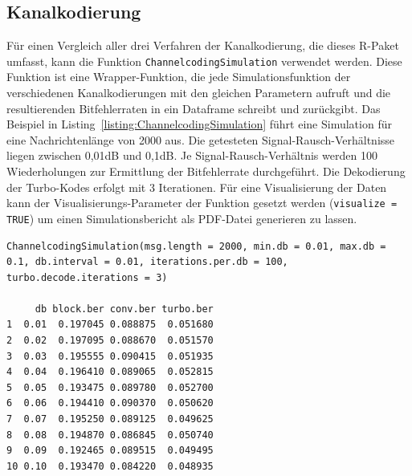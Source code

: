 \subsection{Kanalkodierung}
\label{kapitel:beispiele_simulation_kanalkodierung}
Für einen Vergleich aller drei Verfahren der Kanalkodierung, die dieses R-Paket umfasst, kann die Funktion \texttt{ChannelcodingSimulation} verwendet werden. Diese Funktion ist eine Wrapper-Funktion, die jede Simulationsfunktion der verschiedenen Kanalkodierungen mit den gleichen Parametern aufruft und die resultierenden Bitfehlerraten in ein Dataframe schreibt und zurückgibt. Das Beispiel in Listing~\ref{listing:ChannelcodingSimulation} führt eine Simulation für eine Nachrichtenlänge von 2000 aus. Die getesteten Signal-Rausch-Verhältnisse liegen zwischen 0,01dB und 0,1dB. Je Signal-Rausch-Verhältnis werden 100 Wiederholungen zur Ermittlung der Bitfehlerrate durchgeführt. Die Dekodierung der Turbo-Kodes erfolgt mit 3 Iterationen. Für eine Visualisierung der Daten kann der Visualisierungs-Parameter der Funktion gesetzt werden (\texttt{visualize = TRUE}) um einen Simulationsbericht als PDF-Datei generieren zu lassen.
\begin{lstlisting}[caption=Kanalkodierungs-Simulation, label={listing:ChannelcodingSimulation}, float=!th]
ChannelcodingSimulation(msg.length = 2000, min.db = 0.01, max.db = 0.1, db.interval = 0.01, iterations.per.db = 100, turbo.decode.iterations = 3)

     db block.ber conv.ber turbo.ber
1  0.01  0.197045 0.088875  0.051680
2  0.02  0.197095 0.088670  0.051570
3  0.03  0.195555 0.090415  0.051935
4  0.04  0.196410 0.089065  0.052815
5  0.05  0.193475 0.089780  0.052700
6  0.06  0.194410 0.090370  0.050620
7  0.07  0.195250 0.089125  0.049625
8  0.08  0.194870 0.086845  0.050740
9  0.09  0.192465 0.089515  0.049495
10 0.10  0.193470 0.084220  0.048935
\end{lstlisting}

